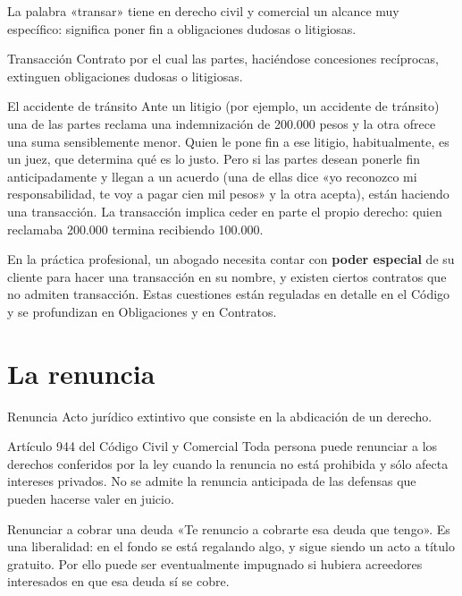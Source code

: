 \documentclass[12pt,oneside]{book}
\begin{document}
La palabra «transar» tiene en derecho civil y comercial un alcance muy específico: significa poner fin a obligaciones dudosas o litigiosas.

\begin{definition}{Transacción}
Contrato por el cual las partes, haciéndose concesiones recíprocas, extinguen obligaciones dudosas o litigiosas.
\end{definition}

\begin{example}{El accidente de tránsito}
Ante un litigio (por ejemplo, un accidente de tránsito) una de las partes reclama una indemnización de 200.000 pesos y la otra ofrece una suma sensiblemente menor. Quien le pone fin a ese litigio, habitualmente, es un juez, que determina qué es lo justo. Pero si las partes desean ponerle fin anticipadamente y llegan a un acuerdo (una de ellas dice «yo reconozco mi responsabilidad, te voy a pagar cien mil pesos» y la otra acepta), están haciendo una transacción. La transacción implica ceder en parte el propio derecho: quien reclamaba 200.000 termina recibiendo 100.000.
\end{example}

En la práctica profesional, un abogado necesita contar con \textbf{poder especial} de su cliente para hacer una transacción en su nombre, y existen ciertos contratos que no admiten transacción. Estas cuestiones están reguladas en detalle en el Código y se profundizan en Obligaciones y en Contratos.

\section{La renuncia}

\begin{definition}{Renuncia}
Acto jurídico extintivo que consiste en la abdicación de un derecho.
\end{definition}

\begin{articulo}{Artículo 944 del Código Civil y Comercial}
Toda persona puede renunciar a los derechos conferidos por la ley cuando la renuncia no está prohibida y sólo afecta intereses privados. No se admite la renuncia anticipada de las defensas que pueden hacerse valer en juicio.
\end{articulo}

\begin{example}{Renunciar a cobrar una deuda}
«Te renuncio a cobrarte esa deuda que tengo». Es una liberalidad: en el fondo se está regalando algo, y sigue siendo un acto a título gratuito. Por ello puede ser eventualmente impugnado si hubiera acreedores interesados en que esa deuda sí se cobre.
\end{example}
\end{document}
